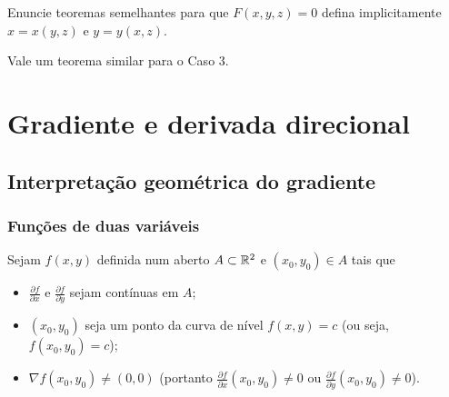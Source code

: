 \begin{exercise}
    Enuncie teoremas semelhantes para que \(F(x,y,z) = 0\) defina implicitamente \(x = x(y,z)\) e \(y = y(x,z)\).
\end{exercise}

\begin{remark}
    Vale um teorema similar para o Caso 3.
\end{remark}

\section{Gradiente e derivada direcional}

\subsection{Interpretação geométrica do gradiente}

\subsubsection{Funções de duas variáveis}

Sejam \(f(x,y)\) definida num aberto \(A\subset\mathbb{R}^2\) e \((x_0,y_0)\in A\) tais que
    \begin{itemize}
        \item \(\frac{\partial f}{\partial x}\) e \(\frac{\partial f}{\partial y}\) sejam contínuas em \(A\);
        \item \((x_0,y_0)\) seja um ponto da curva de nível \(f(x,y)=c\) (ou seja, \(f(x_0,y_0)=c\));
        \item \(\nabla f(x_0,y_0) \neq (0,0)\) (portanto \(\frac{\partial f}{\partial x}(x_0,y_0) \neq 0\) ou \(\frac{\partial f}{\partial y}(x_0,y_0)\neq 0\)).
    \end{itemize}

